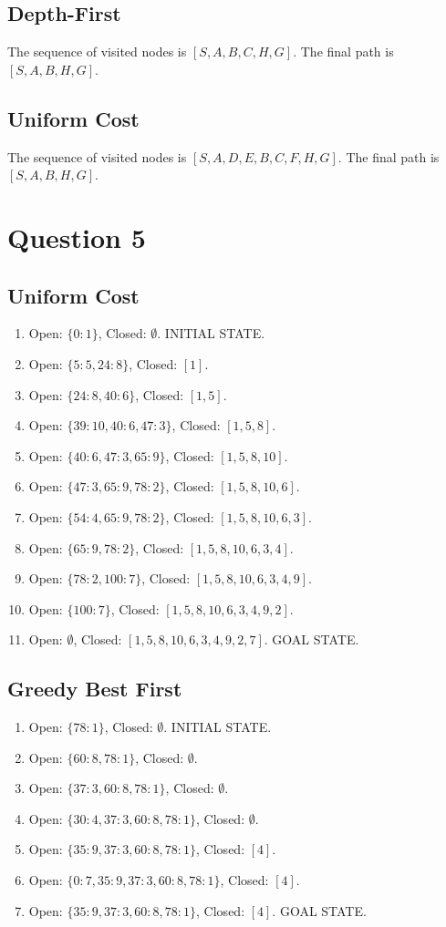 \documentclass[12pt]{article}
\begin{document}
\subsection*{Depth-First}
The sequence of visited nodes is $[S, A, B, C, H, G]$. The final path is $[S, A, B, H, G]$.

\subsection*{Uniform Cost}
The sequence of visited nodes is $[S, A, D, E, B, C, F, H, G]$. The final path is $[S, A, B, H, G]$.

\section*{Question 5}
\subsection*{Uniform Cost}
\begin{enumerate}
\item Open: $\{0: 1\}$, Closed: $\emptyset$. INITIAL STATE.
\item Open: $\{5: 5, 24: 8\}$, Closed: $[1]$.
\item Open: $\{24: 8, 40: 6\}$, Closed: $[1, 5]$.
\item Open: $\{39: 10, 40: 6, 47: 3\}$, Closed: $[1, 5, 8]$.
\item Open: $\{40: 6, 47: 3, 65: 9\}$, Closed: $[1, 5, 8, 10]$.
\item Open: $\{47: 3, 65: 9, 78: 2\}$, Closed: $[1, 5, 8, 10, 6]$.
\item Open: $\{54: 4, 65: 9, 78: 2\}$, Closed: $[1, 5, 8, 10, 6, 3]$.
\item Open: $\{65: 9, 78: 2\}$, Closed: $[1, 5, 8, 10, 6, 3, 4]$.
\item Open: $\{78: 2, 100: 7\}$, Closed: $[1, 5, 8, 10, 6, 3, 4, 9]$.
\item Open: $\{100: 7\}$, Closed: $[1, 5, 8, 10, 6, 3, 4, 9, 2]$.
\item Open: $\emptyset$, Closed: $[1, 5, 8, 10, 6, 3, 4, 9, 2, 7]$. GOAL STATE.
\end{enumerate}

\subsection*{Greedy Best First}
\begin{enumerate}
\item Open: $\{78: 1\}$, Closed: $\emptyset$. INITIAL STATE.
\item Open: $\{60: 8, 78: 1\}$, Closed: $\emptyset$.
\item Open: $\{37: 3, 60: 8, 78: 1\}$, Closed: $\emptyset$.
\item Open: $\{30: 4, 37: 3, 60: 8, 78: 1\}$, Closed: $\emptyset$.
\item Open: $\{35: 9, 37: 3, 60: 8, 78: 1\}$, Closed: $[4]$.
\item Open: $\{0: 7, 35: 9, 37: 3, 60: 8, 78: 1\}$, Closed: $[4]$.
\item Open: $\{35: 9, 37: 3, 60: 8, 78: 1\}$, Closed: $[4]$. GOAL STATE.
\end{enumerate}
\end{document}
